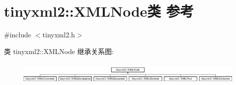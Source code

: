 \hypertarget{classtinyxml2_1_1_x_m_l_node}{}\section{tinyxml2\+:\+:X\+M\+L\+Node类 参考}
\label{classtinyxml2_1_1_x_m_l_node}


{\ttfamily \#include $<$tinyxml2.\+h$>$}

类 tinyxml2\+:\+:X\+M\+L\+Node 继承关系图\+:\begin{figure}[H]
\begin{center}
\leavevmode
\includegraphics[height=1.145194cm]{classtinyxml2_1_1_x_m_l_node}
\end{center}
\end{figure}
